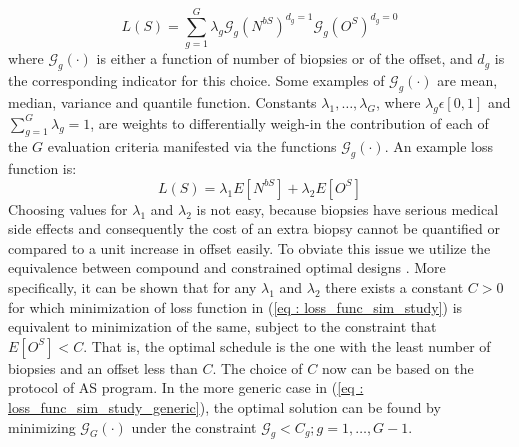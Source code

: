\begin{equation}
\label{eq : loss_func_sim_study_generic}
L(S) = \sum_{g=1}^G \lambda_g \mathcal{G}_g(N^{bS})^{d_g=1}\mathcal{G}_g(O^S)^{d_g=0}
\end{equation}
where $\mathcal{G}_g(\cdot)$ is either a function of number of biopsies or of the offset, and $d_g$ is the corresponding indicator for this choice. Some examples of $\mathcal{G}_g(\cdot)$ are mean, median, variance and quantile function. Constants $\lambda_1, \ldots, \lambda_G$, where $\lambda_g \epsilon [0,1]$ and $\sum_{g=1}^G \lambda_g = 1$, are weights to differentially weigh-in the contribution of each of the $G$ evaluation criteria manifested via the functions $\mathcal{G}_g(\cdot)$. An example loss function is:
\begin{equation}
\label{eq : loss_func_sim_study}
L(S) = \lambda_1 E[N^{bS}] + \lambda_2 E[O^S] 
\end{equation}
Choosing values for $\lambda_1$ and $\lambda_2$ is not easy, because biopsies have serious medical side effects and consequently the cost of an extra biopsy cannot be quantified or compared to a unit increase in offset easily. To obviate this issue we utilize the equivalence between compound and constrained optimal designs \citep{cook1994equivalence}. More specifically, it can be shown that for any $\lambda_1$ and $\lambda_2$ there exists a constant $C>0$ for which minimization of loss function in (\ref{eq : loss_func_sim_study}) is equivalent to minimization of the same, subject to the constraint that $E[O^S] < C$. That is, the optimal schedule is the one with the least number of biopsies and an offset less than $C$. The choice of $C$ now can be based on the protocol of AS program. In the more generic case in (\ref{eq : loss_func_sim_study_generic}), the optimal solution can be found by minimizing $\mathcal{G}_G(\cdot)$ under the constraint $\mathcal{G}_g < C_g; g=1, \ldots, G-1$.